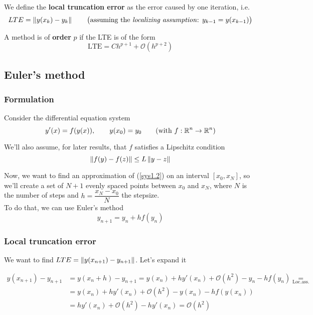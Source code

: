 \begin{definition}
  We define the \textbf{local truncation error} as the error caused by one iteration, i.e. $$LTE = \left\lVert y(x_k) - y_k\right\rVert \qquad \text{\big(assuming the \textit{localizing assumption}: $y_{k-1} = y(x_{k-1})$\big)}$$
\end{definition}

\begin{definition}
  A method is of \textbf{order} $p$ if the LTE is of the form $$\text{LTE} = Ch^{p+1} + \mathcal{O}(h^{p+2})$$
\end{definition}

\subsection{Euler's method}
\subsubsection{Formulation}
Consider the differential equation system
\begin{equation}\label{sys1.2}
  y'(x) = f(y(x)), \qquad y(x_0) = y_0 \qquad (\text{with } f:\mathbb{R}^n \to \mathbb{R}^n)
\end{equation}

We'll also assume, for later results, that $f$ satisfies a Lipschitz condition $$\left\lVert f(y) - f(z)\right\rVert \leq L\left\lVert y-z\right\rVert$$

Now, we want to find an approximation of (\ref{sys1.2}) on an interval $[x_0, x_N]$, so we'll create a set of $N+1$ evenly spaced points between $x_0$ and $x_N$, where $N$ is the number of steps and $h = \dfrac{x_N-x_0}{N}$ the stepsize.\\

To do that, we can use Euler's method
\[
  y_{n+1} = y_n + hf(y_n)
\]

\newpage

\subsubsection{Local truncation error}

We want to find $LTE = \left\lVert y(x_{n+1}) - y_{n+1}\right\rVert$. Let's expand it

\begin{align*}
    y(x_{n+1}) - y_{n+1} &= y(x_n + h) - y_{n+1} = y(x_n) + hy'(x_n) + \mathcal{O}(h^2) - y_n - hf(y_n) \underset{\text{Loc.ass.}}{=} \\
    &= y(x_n)+ hy'(x_n) + \mathcal{O}(h^2) - y(x_n) - hf(y(x_n)) \\
    &= hy'(x_n) + \mathcal{O}(h^2) - hy'(x_n) = \mathcal{O}(h^2)
\end{align*}
  
